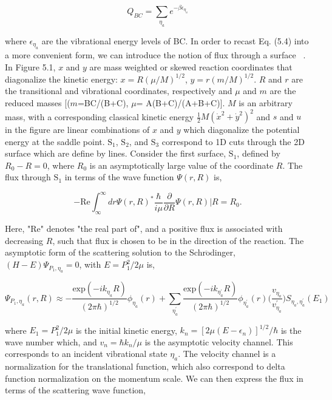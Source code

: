\documentclass[phd,tocprelim]{cornell}
\begin{document}
\begin{equation}
Q_{BC} = \sum_{\eta_a} e^{-\beta \epsilon_{\eta_a}}
\end{equation}

where $\epsilon_{\eta_a}$ are the vibrational energy levels of BC. In order to recast Eq. (5.4) into a more convenient form, we can introduce the notion of flux through a surface ~\cite{LSCHIFF1968}. In Figure 5.1, $x$ and $y$ are mass weighted or skewed reaction coordinates that diagonalize the kinetic energy: $x= R(\mu/M)^{1/2}$, $y= r(m/M)^{1/2}$. $R$ and $r$ are the transitional and vibrational coordinates, respectively and $\mu$ and $m$ are the reduced masses [($m$=BC/(B+C), $\mu$= A(B+C)/(A+B+C)].  $M$ is an arbitrary mass, with a corresponding classical kinetic energy $\frac{1}{2} M (\dot{x}^2 + \dot{y}^2)^2$ and $s$ and $u$ in the figure are linear combinations of $x$ and $y$ which diagonalize the potential energy at the saddle point. $\textrm{S}_1$, $\textrm{S}_2$, and $\textrm{S}_3$ correspond to 1D cuts through the 2D surface which are define by lines. Consider the first surface, $\textrm{S}_1$, defined by $R_0 -R=0$, where $R_0$ is an asymptotically large value of the coordinate $R$. The flux through $\textrm{S}_1$ in terms of the wave function $\Psi(r,R)$ is, 

\begin{equation}
-\textrm{Re} \int_{\infty}^{\infty} dr \Psi(r,R)^{*} \frac{\hbar}{i\mu}\frac{\partial}{\partial R} \Psi(r,R)| R=R_0.
\end{equation}


Here, "Re" denotes "the real part of", and a positive flux is associated with decreasing $R$, such that flux is chosen to be in the direction of the reaction. The asymptotic form of the scattering solution to the Schr$\ddot{\textrm{o}}$dinger, $(H-E)\Psi_{P_1,\eta_{a}}=0$, with $E=P_1^2/2\mu$ is, 

\begin{equation}
\Psi_{P_1, \eta_a}(r,R) \approx - \frac{\textrm{exp}(-ik_{\eta_a}R) }{(2\pi \hbar)^{1/2}} \phi_{\eta_a}(r) + \sum_{\eta_a^{'}}\frac{\textrm{exp}(-ik_{\eta_a^{'}}R) }{(2\pi \hbar)^{1/2}} \phi_{\eta_a^{'}}(r) \bigg(\frac{v_{\eta_a}}{v_{\eta_a}^{'}} \bigg) S_{\eta_a, \eta_a^{'}}(E_1)
\end{equation}

where $E_1=P_1^2/2\mu$ is the initial kinetic energy, $k_n =[2\mu(E-\epsilon_n)]^{1/2}/\hbar$ is the wave number which, and $v_n= \hbar k_n/\mu$ is the asymptotic velocity channel. This corresponds to an incident vibrational state $\eta_{a}$. The velocity channel is a normalization for the translational function, which also correspond to delta function normalization on the momentum scale. 
We can then express the flux in terms of the scattering wave function,
\end{document}
